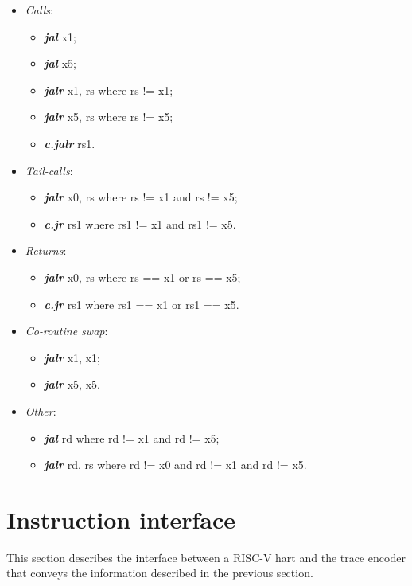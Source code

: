 \begin{itemize}
  \item \textit{Calls}: 
    \begin{itemize}
      \item \textbf{\textit{jal}} x1;
      \item \textbf{\textit{jal}} x5;
      \item \textbf{\textit{jalr}} x1, rs  where rs != x1;
      \item \textbf{\textit{jalr}} x5, rs  where rs != x5;
      \item \textbf{\textit{c.jalr}} rs1.
    \end{itemize}
  \item \textit{Tail-calls}: 
    \begin{itemize}
      \item \textbf{\textit{jalr}} x0, rs where rs != x1 and rs != x5;
      \item \textbf{\textit{c.jr}} rs1 where rs1 != x1 and rs1 != x5.
    \end{itemize}
  \item \textit{Returns}: 
    \begin{itemize}
      \item \textbf{\textit{jalr}} x0, rs where rs == x1 or rs == x5;
      \item \textbf{\textit{c.jr}} rs1 where rs1 == x1 or rs1 == x5.
    \end{itemize}
  \item \textit{Co-routine swap}: 
    \begin{itemize}
      \item \textbf{\textit{jalr}} x1, x1;
      \item \textbf{\textit{jalr}} x5, x5.
    \end{itemize}
  \item \textit{Other}: 
    \begin{itemize}
      \item \textbf{\textit{jal}} rd where rd != x1 and rd != x5;
      \item \textbf{\textit{jalr}} rd, rs where rd != x0 and rd != x1 and rd != x5.
    \end{itemize}
\end{itemize}

\section{Instruction interface}
This section describes the interface between a RISC-V hart and the
trace encoder that conveys the information described in the previous section.  

